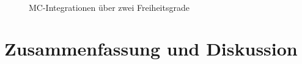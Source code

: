 \begin{figure}[tbp]
	\centering
	 \\
	\caption{MC-Integrationen über zwei Freiheitsgrade}
	\label{11,27,28}
\end{figure}

\chapter{Zusammenfassung und Diskussion}
